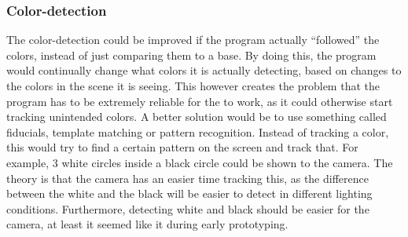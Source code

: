 \subsubsection*{Color-detection}
The color-detection could be improved if the program actually “followed” the colors, instead of just comparing them to a base. By doing this, the program would continually change what colors it is actually detecting, based on changes to the colors in the scene it is seeing. This however creates the problem that the program has to be extremely reliable for the to work, as it could otherwise start tracking unintended colors.
A better solution would be to use something called fiducials, template matching or pattern recognition. Instead of tracking a color, this would try to find a certain pattern on the screen and track that. For example, 3 white circles inside a black circle could be shown to the camera. The theory is that the camera has an easier time tracking this, as the difference between the white and the black will be easier to detect in different lighting conditions. Furthermore, detecting white and black should be easier for the camera, at least it seemed like it during early prototyping.

